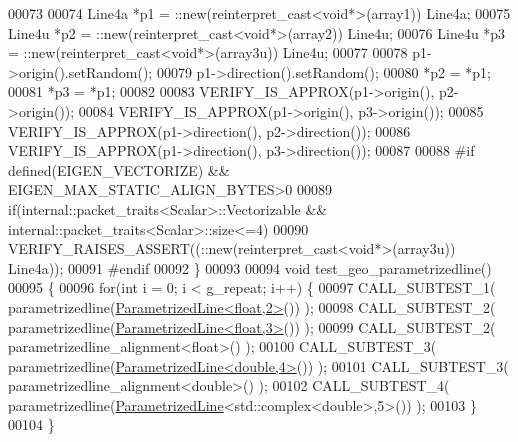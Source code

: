\begin{DoxyCode}
00073 
00074   Line4a *p1 = ::new(reinterpret\_cast<void*>(array1)) Line4a;
00075   Line4u *p2 = ::new(reinterpret\_cast<void*>(array2)) Line4u;
00076   Line4u *p3 = ::new(reinterpret\_cast<void*>(array3u)) Line4u;
00077   
00078   p1->origin().setRandom();
00079   p1->direction().setRandom();
00080   *p2 = *p1;
00081   *p3 = *p1;
00082 
00083   VERIFY\_IS\_APPROX(p1->origin(), p2->origin());
00084   VERIFY\_IS\_APPROX(p1->origin(), p3->origin());
00085   VERIFY\_IS\_APPROX(p1->direction(), p2->direction());
00086   VERIFY\_IS\_APPROX(p1->direction(), p3->direction());
00087   
00088 \textcolor{preprocessor}{  #if defined(EIGEN\_VECTORIZE) && EIGEN\_MAX\_STATIC\_ALIGN\_BYTES>0}
00089   \textcolor{keywordflow}{if}(internal::packet\_traits<Scalar>::Vectorizable && internal::packet\_traits<Scalar>::size<=4)
00090     VERIFY\_RAISES\_ASSERT((::\textcolor{keyword}{new}(reinterpret\_cast<void*>(array3u)) Line4a));
00091 \textcolor{preprocessor}{  #endif}
00092 \}
00093 
00094 \textcolor{keywordtype}{void} test\_geo\_parametrizedline()
00095 \{
00096   \textcolor{keywordflow}{for}(\textcolor{keywordtype}{int} i = 0; i < g\_repeat; i++) \{
00097     CALL\_SUBTEST\_1( parametrizedline(\hyperlink{group___geometry___module_class_eigen_1_1_parametrized_line}{ParametrizedLine<float,2>}()) );
00098     CALL\_SUBTEST\_2( parametrizedline(\hyperlink{group___geometry___module_class_eigen_1_1_parametrized_line}{ParametrizedLine<float,3>}()) );
00099     CALL\_SUBTEST\_2( parametrizedline\_alignment<float>() );
00100     CALL\_SUBTEST\_3( parametrizedline(\hyperlink{group___geometry___module_class_eigen_1_1_parametrized_line}{ParametrizedLine<double,4>}()) );
00101     CALL\_SUBTEST\_3( parametrizedline\_alignment<double>() );
00102     CALL\_SUBTEST\_4( parametrizedline(\hyperlink{group___geometry___module_class_eigen_1_1_parametrized_line}{ParametrizedLine}<std::complex<double>,5>()) );
00103   \}
00104 \}
\end{DoxyCode}

